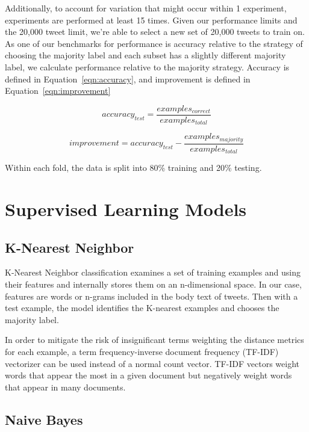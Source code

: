\documentclass[midd]{thesis}
\begin{document}
Additionally, to account for variation that might occur within 1 experiment, experiments are performed at least 15 times. Given our performance limits and the 20,000 tweet limit, we're able to select a new set of 20,000 tweets to train on. As one of our benchmarks for performance is accuracy relative to the strategy of choosing the majority label and each subset has a slightly different majority label, we calculate performance relative to  the majority strategy. Accuracy is defined in Equation~\ref{eqn:accuracy}, and improvement is defined in Equation~\ref{eqn:improvement}

\begin{equation}
\label{eqn:accuracy}
accuracy_{test}=\frac{examples_{correct}}{examples_{total}}
\end{equation}

\begin{equation}
\label{eqn:improvement}
improvement=accuracy_{test} - \frac{examples_{majority}}{examples_{total}}
\end{equation}

Within each fold, the data is split into 80\% training and 20\% testing.

\section{Supervised Learning Models}
\subsection{K-Nearest Neighbor}

K-Nearest Neighbor classification examines a set of training examples and using their features and internally stores them on an n-dimensional space. In our case, features are words or n-grams included in the body text of tweets. Then with a test example, the model identifies the K-nearest examples and chooses the majority label.

In order to mitigate the risk of insignificant terms weighting the distance metrics for each example, a term frequency-inverse document frequency (TF-IDF) vectorizer can be used instead of a  normal count vector. TF-IDF vectors weight words that appear the most in a given document but negatively weight words that appear in many documents.


\subsection{Naive Bayes}
\end{document}
